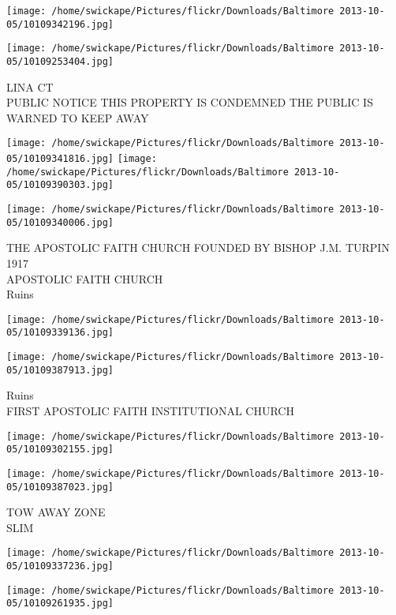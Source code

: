\documentclass[10pt,letterpaper]{article}
\begin{document}
\texttt{[image: /home/swickape/Pictures/flickr/Downloads/Baltimore 2013-10-05/10109342196.jpg]}

\vspace{0.25in}
\texttt{[image: /home/swickape/Pictures/flickr/Downloads/Baltimore 2013-10-05/10109253404.jpg]}

LINA CT\\
PUBLIC NOTICE THIS PROPERTY IS CONDEMNED THE PUBLIC IS WARNED TO KEEP AWAY
\pagebreak

\texttt{[image: /home/swickape/Pictures/flickr/Downloads/Baltimore 2013-10-05/10109341816.jpg]}
\texttt{[image: /home/swickape/Pictures/flickr/Downloads/Baltimore 2013-10-05/10109390303.jpg]}

\vspace{0.25in}
\texttt{[image: /home/swickape/Pictures/flickr/Downloads/Baltimore 2013-10-05/10109340006.jpg]}

THE APOSTOLIC FAITH CHURCH FOUNDED BY BISHOP J.M. TURPIN 1917\\
APOSTOLIC FAITH CHURCH\\
Ruins
\pagebreak

\texttt{[image: /home/swickape/Pictures/flickr/Downloads/Baltimore 2013-10-05/10109339136.jpg]}

\vspace{0.25in}
\texttt{[image: /home/swickape/Pictures/flickr/Downloads/Baltimore 2013-10-05/10109387913.jpg]}

Ruins\\
FIRST APOSTOLIC FAITH INSTITUTIONAL CHURCH
\pagebreak

\texttt{[image: /home/swickape/Pictures/flickr/Downloads/Baltimore 2013-10-05/10109302155.jpg]}

\vspace{0.25in}
\texttt{[image: /home/swickape/Pictures/flickr/Downloads/Baltimore 2013-10-05/10109387023.jpg]}

TOW AWAY ZONE\\
SLIM
\pagebreak

\texttt{[image: /home/swickape/Pictures/flickr/Downloads/Baltimore 2013-10-05/10109337236.jpg]}

\vspace{0.25in}
\texttt{[image: /home/swickape/Pictures/flickr/Downloads/Baltimore 2013-10-05/10109261935.jpg]}
\end{document}
